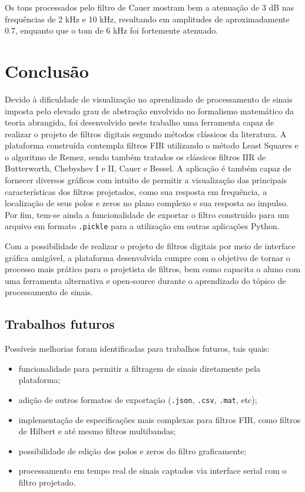 \documentclass[12pt,a4paper]{report}
\begin{document}
  Os tons processados pelo filtro de Cauer mostram bem a atenuação de 3 dB nas frequências de 2 kHz e 10 kHz,
  resultando em amplitudes de aproximadamente 0.7, enquanto que o tom de 6 kHz foi fortemente atenuado.
  
\chapter{Conclusão}
  Devido à dificuldade de visualização no aprendizado de processamento de sinais imposta pelo elevado grau de
  abstração envolvido no formalismo matemático da teoria abrangida, foi desenvolvido neste trabalho uma
  ferramenta capaz de realizar o projeto de filtros digitais segundo métodos clássicos da literatura.
  A plataforma construída contempla filtros FIR utilizando o método Least Squares e o algoritmo de Remez,
  sendo também tratados os clássicos filtros IIR de Butterworth, Chebyshev I e II, Cauer e Bessel. A aplicação é
  também capaz de fornecer diversos gráficos com intuito de permitir a visualização das principais
  características dos filtros projetados, como sua resposta em frequência, a localização de seus polos e zeros
  no plano complexo e sua resposta ao impulso. Por fim, tem-se ainda a funcionalidade de exportar o filtro
  construído para um arquivo em formato \texttt{.pickle} para a utilização em outras aplicações Python.

  Com a possibilidade de realizar o projeto de filtros digitais por meio de interface gráfica amigável,
  a plataforma desenvolvida cumpre com o objetivo de tornar o processo mais prático para o projetista de filtros,
  bem como capacita o aluno com uma ferramenta alternativa e open-source durante o aprendizado do tópico de
  processamento de sinais.

\section{Trabalhos futuros}
  Possíveis melhorias foram identificadas para trabalhos futuros, tais quais:

  \begin{itemize}
    \item funcionalidade para permitir a filtragem de sinais diretamente pela plataforma;
    \item adição de outros formatos de exportação (\texttt{.json}, \texttt{.csv}, \texttt{.mat}, etc);
    \item implementação de especificações mais complexas para filtros FIR, como filtros de Hilbert e até mesmo
      filtros multibandas;
    \item possibilidade de edição dos polos e zeros do filtro graficamente;
    \item processamento em tempo real de sinais captados via interface serial com o filtro projetado.
  \end{itemize}
\end{document}
